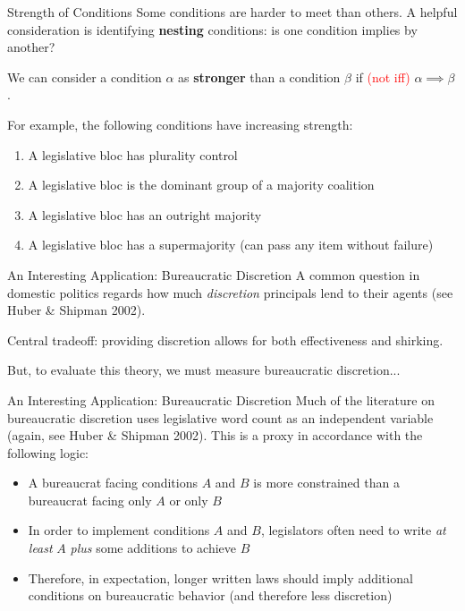 \documentclass[10pt]{beamer}
\begin{document}
\begin{frame}{Strength of Conditions}
    Some conditions are harder to meet than others. A helpful consideration is identifying \textbf{nesting} conditions: is one condition implies by another?

    We can consider a condition $\alpha$ as \textbf{stronger} than a condition $\beta$ if \textcolor{red}{(not iff)} $\alpha \implies \beta$.

    \pause
    For example, the following conditions have increasing strength:
    \begin{enumerate}
        \item A legislative bloc has plurality control
        \item A legislative bloc is the dominant group of a majority coalition
        \item A legislative bloc has an outright majority
        \item A legislative bloc has a supermajority (can pass any item without failure)
    \end{enumerate}
\end{frame}

\begin{frame}{An Interesting Application: Bureaucratic Discretion}
    A common question in domestic politics regards how much \emph{discretion} principals lend to their agents (see Huber \& Shipman 2002).

    Central tradeoff: providing discretion allows for both effectiveness and shirking.

    But, to evaluate this theory, we must measure bureaucratic discretion...
\end{frame}

\begin{frame}{An Interesting Application: Bureaucratic Discretion}
    Much of the literature on bureaucratic discretion uses legislative word count as an independent variable (again, see Huber \& Shipman 2002). This is a proxy in accordance with the following logic:

    \begin{itemize}
        \item A bureaucrat facing conditions $A$ and $B$ is more constrained than a bureaucrat facing only $A$ or only $B$
        \item In order to implement conditions $A$ and $B$, legislators often need to write \emph{at least} $A$ \emph{plus} some additions to achieve $B$
        \item Therefore, in expectation, longer written laws should imply additional conditions on bureaucratic behavior (and therefore less discretion)
    \end{itemize}
\end{frame}
\end{document}
